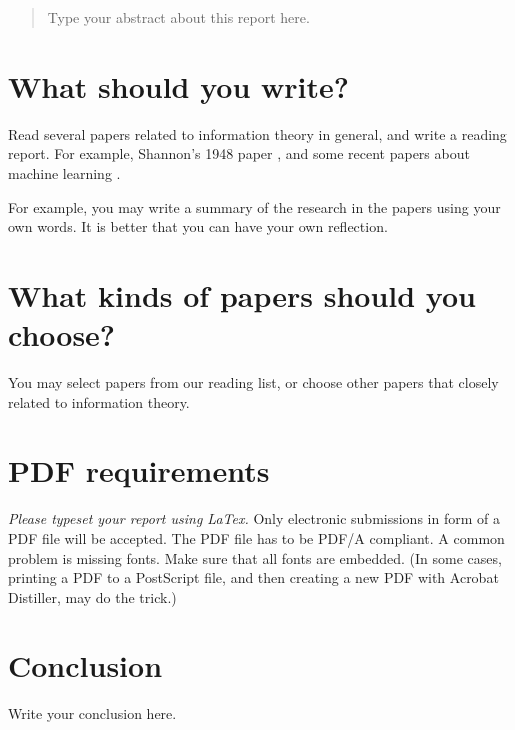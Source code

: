 \documentclass[]{article}
\begin{document}
\maketitle

\begin{abstract}
Type your abstract about this report here.  
\end{abstract}

\section{What should you write?}
Read several papers related to information theory in general, and
write a reading report. For example, Shannon's 1948 paper
\cite{shannon1948}, and some recent papers about machine learning \cite{feizi2017understanding,farias2010universal}.

For example, you may write a summary of the research in the papers
using your own words. It is better that you can have your own
reflection. 




\section{What kinds of papers should you choose?}
You may select papers from our reading list, or choose other papers that closely related to information theory.

 

\section{PDF requirements}
\emph{Please typeset your report using LaTex.} Only electronic submissions in form of a PDF file will be
accepted. The PDF file has to be PDF/A compliant. A common problem is
missing fonts. Make sure that all fonts are embedded. (In some cases,
printing a PDF to a PostScript file, and then creating a new PDF with
Acrobat Distiller, may do the trick.)


\section{Conclusion}
Write your conclusion here.


\printbibliography
\end{document}
